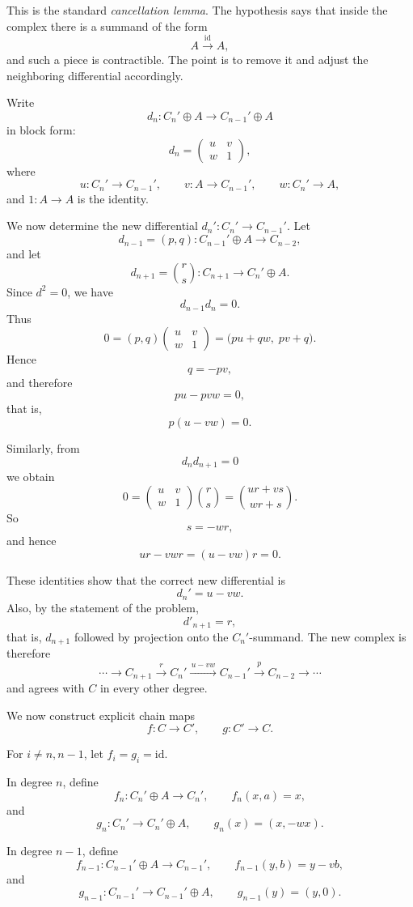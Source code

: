 \begin{solution}
This is the standard \emph{cancellation lemma}. The hypothesis says that inside the complex there is a summand of the form
\[
A \xrightarrow{\;\mathrm{id}\;} A,
\]
and such a piece is contractible. The point is to remove it and adjust the neighboring differential accordingly.

Write
\[
d_n:C_n'\oplus A\longrightarrow C_{n-1}'\oplus A
\]
in block form:
\[
d_n=
\begin{pmatrix}
	u & v\\
	w & 1
\end{pmatrix},
\]
where
\[
u:C_n'\to C_{n-1}',\qquad
v:A\to C_{n-1}',\qquad
w:C_n'\to A,
\]
and \(1:A\to A\) is the identity.

We now determine the new differential \(d_n':C_n'\to C_{n-1}'\). Let
\[
d_{n-1}=(p,q):C_{n-1}'\oplus A\to C_{n-2},
\]
and let
\[
d_{n+1}=\binom{r}{s}:C_{n+1}\to C_n'\oplus A.
\]
Since \(d^2=0\), we have
\[
d_{n-1}d_n=0.
\]
Thus
\[
0=(p,q)
\begin{pmatrix}
	u & v\\
	w & 1
\end{pmatrix}
=
\bigl(pu+qw,\;pv+q\bigr).
\]
Hence
\[
q=-pv,
\]
and therefore
\[
pu-pvw=0,
\]
that is,
\[
p(u-vw)=0.
\]

Similarly, from
\[
d_n d_{n+1}=0
\]
we obtain
\[
0=
\begin{pmatrix}
	u & v\\
	w & 1
\end{pmatrix}
\binom{r}{s}
=
\binom{ur+vs}{wr+s}.
\]
So
\[
s=-wr,
\]
and hence
\[
ur-vwr=(u-vw)r=0.
\]

These identities show that the correct new differential is
\[
d_n'=u-vw.
\]
Also, by the statement of the problem,
\[
d'_{n+1}=r,
\]
that is, \(d_{n+1}\) followed by projection onto the \(C_n'\)-summand. The new complex is therefore
\[
\cdots \to C_{n+1}\xrightarrow{\,r\,}C_n'\xrightarrow{\,u-vw\,}C_{n-1}'\xrightarrow{\,p\,}C_{n-2}\to\cdots
\]
and agrees with \(C\) in every other degree.

We now construct explicit chain maps
\[
f:C\to C',
\qquad
g:C'\to C.
\]

For \(i\neq n,n-1\), let \(f_i=g_i=\mathrm{id}\).

In degree \(n\), define
\[
f_n:C_n'\oplus A\to C_n',
\qquad
f_n(x,a)=x,
\]
and
\[
g_n:C_n'\to C_n'\oplus A,
\qquad
g_n(x)=(x,-wx).
\]

In degree \(n-1\), define
\[
f_{n-1}:C_{n-1}'\oplus A\to C_{n-1}',
\qquad
f_{n-1}(y,b)=y-vb,
\]
and
\[
g_{n-1}:C_{n-1}'\to C_{n-1}'\oplus A,
\qquad
g_{n-1}(y)=(y,0).
\]


\end{solution}
